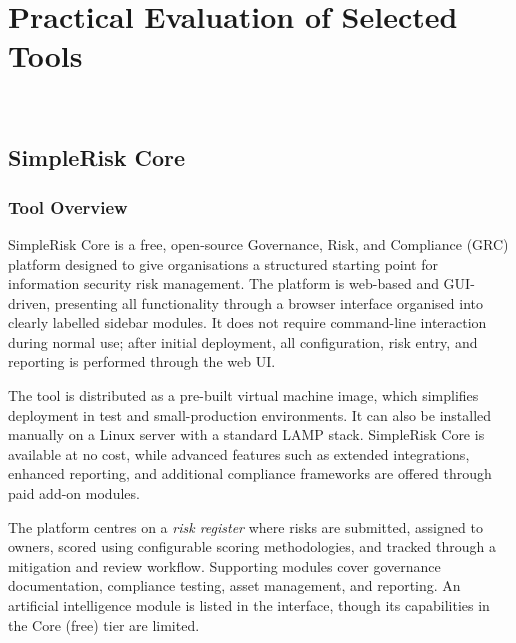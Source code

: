 \section{Practical Evaluation of Selected Tools}
~\label{chap:practical-evaluation}
\subsection{SimpleRisk Core}

\subsubsection{Tool Overview}

SimpleRisk Core is a free, open-source Governance, Risk, and Compliance (GRC) platform
designed to give organisations a structured starting point for information security risk
management. The platform is web-based and GUI-driven, presenting all functionality through
a browser interface organised into clearly labelled sidebar modules. It does not require
command-line interaction during normal use; after initial deployment, all configuration,
risk entry, and reporting is performed through the web UI.

The tool is distributed as a pre-built virtual machine image, which simplifies deployment
in test and small-production environments. It can also be installed manually on a Linux
server with a standard LAMP stack. SimpleRisk Core is available at no cost, while
advanced features such as extended integrations, enhanced reporting, and additional
compliance frameworks are offered through paid add-on modules.

The platform centres on a \textit{risk register} where risks are submitted, assigned to
owners, scored using configurable scoring methodologies, and tracked through a mitigation
and review workflow. Supporting modules cover governance documentation, compliance
testing, asset management, and reporting. An artificial intelligence module is listed in
the interface, though its capabilities in the Core (free) tier are limited.

